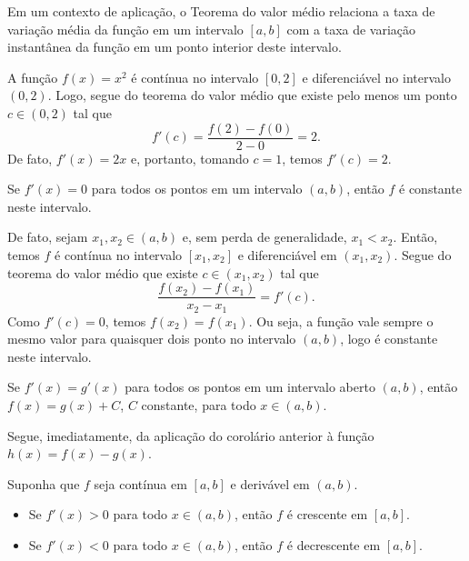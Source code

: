\begin{obs}
  Em um contexto de aplicação, o Teorema do valor médio relaciona a taxa de variação média da função em um intervalo $[a, b]$ com a taxa de variação instantânea da função em um ponto interior deste intervalo.
\end{obs}

\begin{ex}
  A função $f(x)=x^2$ é contínua no intervalo $[0,2]$ e diferenciável no intervalo $(0,2)$. Logo, segue do teorema do valor médio que existe pelo menos um ponto $c\in (0,2)$ tal que
  \begin{equation}
    f'(c)=\frac{f(2)-f(0)}{2-0}=2.
  \end{equation}
  De fato, $f'(x)=2x$ e, portanto, tomando $c=1$, temos $f'(c)=2$.
\end{ex}

\begin{corol}
  Se $f'(x)=0$ para todos os pontos em um intervalo $(a, b)$, então $f$ é constante neste intervalo.
\end{corol}
\begin{dem}
  De fato, sejam $x_1,x_2\in (a, b)$ e, sem perda de generalidade, $x_1<x_2$. Então, temos $f$ é contínua no intervalo $[x_1,x_2]$ e diferenciável em $(x_1,x_2)$. Segue do teorema do valor médio que existe $c\in (x_1,x_2)$ tal que
  \begin{equation}
    \frac{f(x_2)-f(x_1)}{x_2-x_1}=f'(c).
  \end{equation}
  Como $f'(c)=0$, temos $f(x_2)=f(x_1)$. Ou seja, a função vale sempre o mesmo valor para quaisquer dois ponto no intervalo $(a, b)$, logo é constante neste intervalo.
\end{dem}

\begin{corol}
  Se $f'(x)=g'(x)$ para todos os pontos em um intervalo aberto $(a,b)$, então $f(x)=g(x)+C$, $C$ constante, para todo $x\in (a,b)$.
\end{corol}
\begin{dem}
  Segue, imediatamente, da aplicação do corolário anterior à função $h(x)=f(x)-g(x)$.
\end{dem}

\begin{corol}\label{corol:mono_deriv}
  Suponha que $f$ seja contínua em $[a,b]$ e derivável em $(a,b)$.
  \begin{itemize}
  \item Se $f'(x)>0$ para todo $x\in (a,b)$, então $f$ é crescente em $[a,b]$.
  \item Se $f'(x)<0$ para todo $x\in (a,b)$, então $f$ é decrescente em $[a,b]$.
  \end{itemize}
\end{corol}

